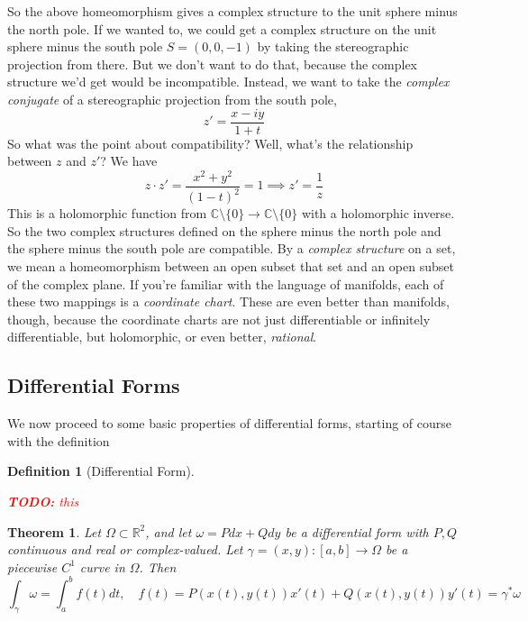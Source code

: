 \documentclass{article}
\newtheorem{theorem}{Theorem}
\newcommand{\mbb}[1]{\mathbb{#1}}
\newcommand{\reals}{\mbb{R}}
\newtheorem{definition}{Definition}
\newcommand{\TODO}[1]{\begin{center}\huge{\textcolor{red}{\textbf{TODO:} #1}}\end{center}}
\begin{document}
So the above homeomorphism gives a complex structure to the unit sphere minus the north pole. If we wanted to, we could get a complex structure on the unit sphere minus the south pole \(S = (0, 0, -1)\) by taking the stereographic projection from there. But we don't want to do that, because the complex structure we'd get would be incompatible. Instead, we want to take the \textit{complex conjugate} of a stereographic projection from the south pole,
\begin{equation}z' = \frac{x - iy}{1 + t}\end{equation}
So what was the point about compatibility? Well, what's the relationship between \(z\) and \(z'\)? We have
\begin{equation}z \cdot z' = \frac{x^2 + y^2}{(1 - t)^2} = 1 \implies z' = \frac{1}{z}\end{equation}
This is a holomorphic function from \(\mbb{C} \setminus \{0\} \to \mbb{C} \setminus \{0\}\) with a holomorphic inverse. So the two complex structures defined on the sphere minus the north pole and the sphere minus the south pole are compatible. By a \textit{complex structure} on a set, we mean a homeomorphism between an open subset that set and an open subset of the complex plane. If you're familiar with the language of manifolds, each of these two mappings is a \textit{coordinate chart}. These are even better than manifolds, though, because the coordinate charts are not just differentiable or infinitely differentiable, but holomorphic, or even better, \textit{rational}.

\subsection{Differential Forms}

We now proceed to some basic properties of differential forms, starting of course with the definition
\begin{definition}[Differential Form]
\TODO{this}
\end{definition}

\begin{theorem}
Let \(\Omega \subset \reals^2\), and let \(\omega = Pdx + Qdy\) be a differential form with \(P, Q\) continuous and real or complex-valued. Let \(\gamma = (x, y): [a, b] \to \Omega\) be a piecewise \(C^1\) curve in \(\Omega\). Then
\begin{equation}
  \int_\gamma\omega = \int_a^bf(t)dt,
  \quad f(t) = P(x(t), y(t))x'(t) + Q(x(t), y(t))y'(t) = \gamma^*\omega
\end{equation}
\end{theorem}
\end{document}
